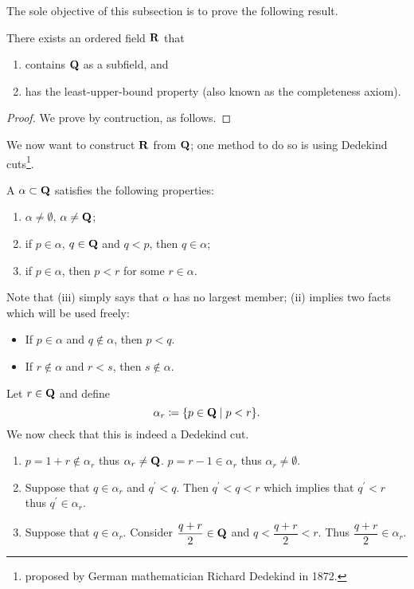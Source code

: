 The sole objective of this subsection is to prove the following result.

\begin{theorem}
There exists an ordered field $\mathbf R$ that
\begin{enumerate}[label=(\roman*)]
\item contains $\mathbf Q$ as a subfield, and
\item has the least-upper-bound property (also known as the completeness axiom).
\end{enumerate}
\end{theorem}

\begin{proof}
We prove by contruction, as follows. 
\end{proof}

We now want to construct $\mathbf R$ from $\mathbf Q$; one method to do so is using Dedekind cuts\footnote{proposed by German mathematician Richard Dedekind in 1872.}.

\begin{definition}
A  $\alpha\subset\mathbf Q$ satisfies the following properties:
\begin{enumerate}[label=(\roman*)]
\item $\alpha\neq\emptyset$, $\alpha\neq\mathbf Q$;
\item if $p\in\alpha$, $q\in\mathbf Q$ and $q<p$, then $q\in\alpha$;
\item if $p\in\alpha$, then $p<r$ for some $r\in\alpha$.
\end{enumerate}
\end{definition}

\begin{remark}
Note that (iii) simply says that $\alpha$ has no largest member; (ii) implies two facts which will be used freely:
\begin{itemize}
\item If $p\in\alpha$ and $q\notin\alpha$, then $p<q$.
\item If $r\notin\alpha$ and $r<s$, then $s\notin\alpha$.
\end{itemize}
\end{remark}

\begin{example}
Let $r\in\mathbf Q$ and define
\[ \alpha_r\coloneqq\{p\in\mathbf Q\mid p<r\}. \]
We now check that this is indeed a Dedekind cut.
\begin{enumerate}[label=(\roman*)]
\item $p=1+r\notin\alpha_r$ thus $\alpha_r\neq\mathbf Q$. $p=r-1\in\alpha_r$ thus $\alpha_r\neq\emptyset$.

\item Suppose that $q\in\alpha_r$ and $q^\prime<q$. Then $q^\prime<q<r$ which implies that $q^\prime<r$ thus $q^\prime\in\alpha_r$.

\item Suppose that $q\in\alpha_r$. Consider $\dfrac{q+r}{2}\in\mathbf Q$ and $q<\dfrac{q+r}{2}<r$. Thus $\dfrac{q+r}{2}\in\alpha_r$.
\end{enumerate}
\end{example}

